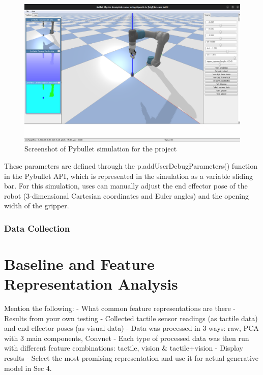 \documentclass[12pt, a4paper]{report}
\theoremstyle{definition}
\begin{document}
\begin{figure}[H]
    \centering
    \includegraphics[scale=0.25]{docs/Project Report/Media/pybullet_sim.png}
    \caption{Screenshot of Pybullet simulation for the project}
    \label{fig:pbSimScreenshot}
\end{figure}

These parameters are defined through the p.addUserDebugParameters() function in the Pybullet API, which is represented in the simulation as a variable sliding bar. For this simulation, uses can manually adjust the end effector pose of the robot (3-dimensional Cartesian coordinates and Euler angles) and the opening width of the gripper.




\subsection{Data Collection}
\label{sec:3.3.1}



\chapter{Baseline and Feature Representation Analysis}
\label{chap:4}
Mention the following:
- What common feature representations are there
- Results from your own testing
    - Collected tactile sensor readings (as tactile data) and end effector poses (as visual data)
    - Data was processed in 3 ways: raw, PCA with 3 main components, Convnet
    - Each type of processed data was then run with different feature combinations: tactile, vision \& tactile+vision
    - Display results
- Select the most promising representation and use it for actual generative model in Sec 4.
\end{document}
